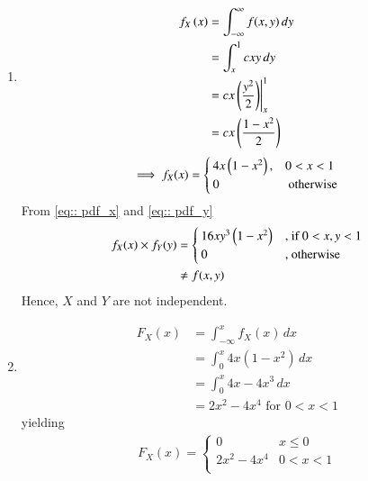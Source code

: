\begin{enumerate}
\item 
\begin{align}
    f_X\left(x\right) &=  \int_{-\infty}^{\infty} f(x,y) \,dy \\
    &= \int_{x}^{1} cxy \,dy \\
    &= cx \left(\frac{y^2}{2}\right) \Biggr|_{x}^{1} \\
    &= cx \left(\frac{1- x^2}{2}\right)
\end{align}
%
\begin{align}
\label{eq:: pdf_x}
\implies f_X(x)  = 
\begin{cases}
4x \left(1- x^2\right), &  0<x<1
\\
0 & \text{ otherwise }
\end{cases}
\end{align} 
%
From \eqref{eq:: pdf_x} and \eqref{eq:: pdf_y}
\begin{align}
f_X(x) \times f_Y(y) & = 
\begin{cases}
16xy^3 \left(1- x^2\right) & \text{, if } 0<x,y<1 
\\
0 & \text{, otherwise }
\end{cases}
\\
  &\neq f(x,y)
\end{align} 
Hence, $X$ and $Y$ are not independent. 
\item
\begin{align}
    F_X(x) &=  \int_{-\infty}^{x} f_X(x) \,dx \\
    &= \int_{0}^{x} 4x(1-x^2) \,dx \\
     &= \int_{0}^{x} 4x-4x^3 \,dx \\
     & = 2x^2 - 4x^4 \text{ for }  0< x< 1
\end{align}
yielding
\begin{align}
\label{eq:: cdf_x}
F_X(x)  = 
\begin{cases}
0 &  x \le 0
\\
2x^2 - 4x^4    &  0 <x< 1
\\

\end{cases}
\end{align}
\end{enumerate}
